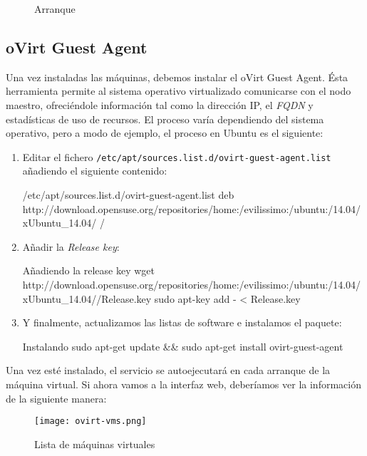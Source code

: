 \begin{figure}[ht!]
  \centering
  \caption{\label{fig:vm_boot} Arranque}
\end{figure}

\clearpage
\subsection{oVirt Guest Agent}
\label{subsec:guestagent}

Una vez instaladas las máquinas, debemos instalar el oVirt Guest Agent. Ésta herramienta permite al sistema operativo virtualizado comunicarse con el nodo maestro, ofreciéndole información tal como la dirección IP, el \emph{FQDN} y estadísticas de uso de recursos. El proceso varía dependiendo del sistema operativo, pero a modo de ejemplo, el proceso en Ubuntu es el siguiente:

\begin{enumerate}
\item Editar el fichero \texttt{/etc/apt/sources.list.d/ovirt-guest-agent.list} añadiendo el siguiente contenido:

    \begin{TMterminal}{}{}{/etc/apt/sources.list.d/ovirt-guest-agent.list}
        deb http://download.opensuse.org/repositories/home:/evilissimo:/ubuntu:/14.04/xUbuntu_14.04/ /
    \end{TMterminal}

\item Añadir la \emph{Release key}:

    \begin{TMterminal}{}{}{Añadiendo la release key}
        wget http://download.opensuse.org/repositories/home:/evilissimo:/ubuntu:/14.04/xUbuntu_14.04//Release.key
        sudo apt-key add - < Release.key  
    \end{TMterminal}

\item Y finalmente, actualizamos las listas de software e instalamos el paquete:

    \begin{TMterminal}{}{}{Instalando}
        sudo apt-get update && sudo apt-get install ovirt-guest-agent
    \end{TMterminal}
\end{enumerate}

Una vez esté instalado, el servicio se autoejecutará en cada arranque de la máquina virtual. Si ahora vamos a la interfaz web, deberíamos ver la información de la siguiente manera:

\begin{figure}[ht!]
  \centering
  \hspace*{-1cm}
  \texttt{[image: ovirt-vms.png]}
  \caption{\label{fig:listado_vms} Lista de máquinas virtuales}
\end{figure}











